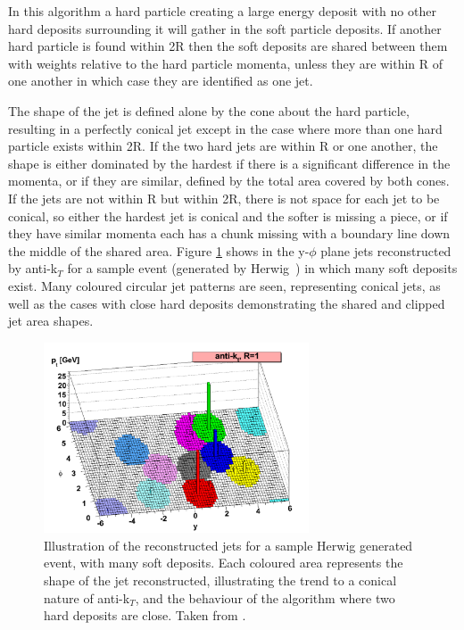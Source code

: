 In this algorithm a hard particle creating a large energy deposit with no other hard deposits surrounding it will gather in the soft particle deposits. If another hard particle is found within 2R then the soft deposits are shared between them with weights relative to the hard particle momenta, unless they are within R of one another in which case they are identified as one jet. 

The shape of the jet is defined alone by the cone about the hard particle, resulting in a perfectly conical jet except in the case where more than one hard particle exists within 2R. If the two hard jets are within R or one another, the shape is either dominated by the hardest if there is a significant difference in the momenta, or if they are similar, defined by the total area covered by both cones. If the jets are not within R but within 2R, there is not space for each jet to be conical, so either the hardest jet is conical and the softer is missing a piece, or if they have similar momenta each has a chunk missing with a boundary line down the middle of the shared area. Figure \ref{fig:akt} shows in the y-$\phi$ plane jets reconstructed by anti-k$_{T}$ for a sample event (generated by Herwig~\cite{HERWIG}) in which many soft deposits exist. Many coloured circular jet patterns are seen, representing conical jets, as well as the cases with close hard deposits demonstrating the shared and clipped jet area shapes. 

\begin{figure}
\centering
\includegraphics[width=0.7\textwidth]{Figures/Objects/akt}
\caption{\label{fig:akt}Illustration of the reconstructed jets for a sample Herwig generated event, with many soft deposits. Each coloured area represents the shape of the jet reconstructed, illustrating the trend to a conical nature of anti-k$_{T}$, and the behaviour of the algorithm where two hard deposits are close. Taken from \cite{akt}.}
\end{figure}

